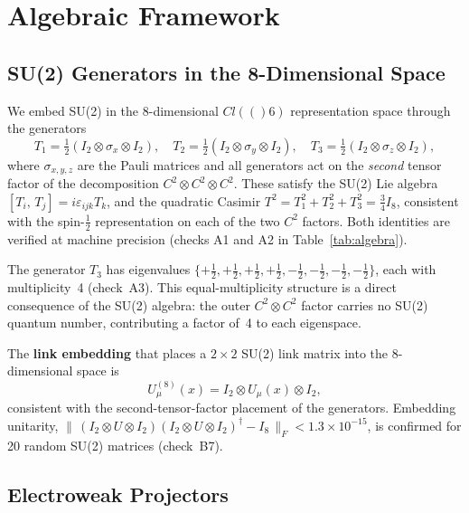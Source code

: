 \documentclass[12pt,a4paper]{article}
\newcommand{\Cl}{\mathrm{Cl}}
\newcommand{\CC}{\mathbb{C}}
\newcommand{\Id}[1]{I_{#1}}
\newcommand{\sigx}{\sigma_x}
\newcommand{\sigy}{\sigma_y}
\newcommand{\sigz}{\sigma_z}
\newcommand{\brac}[2]{\left[#1,\,#2\right]}
\def\Cl#1{Cl(#1)}%
\def\CC{C}%
\def\mathbb#1{#1}%
\def\mathrm#1{#1}%
\begin{document}
	\section{Algebraic Framework}
	
	\subsection{SU(2) Generators in the 8-Dimensional Space}
	
	We embed SU(2) in the 8-dimensional $\Cl(6)$ representation space through the
	generators
	\begin{equation}
		T_1 = \tfrac{1}{2}(\Id{2}\otimes\sigx\otimes\Id{2}),\quad
		T_2 = \tfrac{1}{2}(\Id{2}\otimes\sigy\otimes\Id{2}),\quad
		T_3 = \tfrac{1}{2}(\Id{2}\otimes\sigz\otimes\Id{2}),
	\end{equation}
	where $\sigma_{x,y,z}$ are the Pauli matrices and all generators act on the
	\emph{second} tensor factor of the decomposition $\CC^2\otimes\CC^2\otimes\CC^2$.
	These satisfy the SU(2) Lie algebra $\brac{T_i}{T_j}=i\varepsilon_{ijk}T_k$, and
	the quadratic Casimir $T^2=T_1^2+T_2^2+T_3^2=\tfrac{3}{4}\Id{8}$, consistent
	with the spin-$\tfrac{1}{2}$ representation on each of the two $\CC^2$ factors.
	Both identities are verified at machine precision (checks A1 and A2 in
	Table~\ref{tab:algebra}).
	
	The generator $T_3$ has eigenvalues
	$\{+\tfrac{1}{2},+\tfrac{1}{2},+\tfrac{1}{2},+\tfrac{1}{2},
	-\tfrac{1}{2},-\tfrac{1}{2},-\tfrac{1}{2},-\tfrac{1}{2}\}$,
	each with multiplicity~4 (check~A3).  This equal-multiplicity structure is a
	direct consequence of the SU(2) algebra: the outer
	$\CC^2\otimes\CC^2$ factor carries no SU(2) quantum number, contributing a factor
	of~4 to each eigenspace.
	
	The \textbf{link embedding} that places a $2\times2$ SU(2) link matrix into the
	8-dimensional space is
	\begin{equation}
		U_\mu^{(8)}(x) = \Id{2}\otimes U_\mu(x)\otimes\Id{2},
	\end{equation}
	consistent with the second-tensor-factor placement of the generators.  Embedding
	unitarity,
	$\|\,(\Id{2}\otimes U\otimes\Id{2})(\Id{2}\otimes U\otimes\Id{2})^\dagger
	-\Id{8}\,\|_F < 1.3\times10^{-15}$,
	is confirmed for 20 random SU(2) matrices (check~B7).
	
	\subsection{Electroweak Projectors}
	
\end{document}
